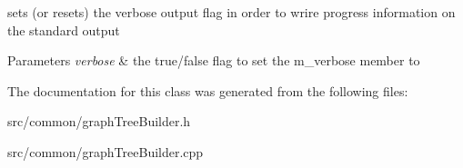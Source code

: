 sets (or resets) the verbose output flag in order to wrire progress information on the standard output 
\begin{DoxyParams}{\-Parameters}
{\em verbose} & the true/false flag to set the m\-\_\-verbose member to \\
\hline
\end{DoxyParams}


\-The documentation for this class was generated from the following files\-:\begin{DoxyCompactItemize}
\item 
src/common/graph\-Tree\-Builder.\-h\item 
src/common/graph\-Tree\-Builder.\-cpp\end{DoxyCompactItemize}
